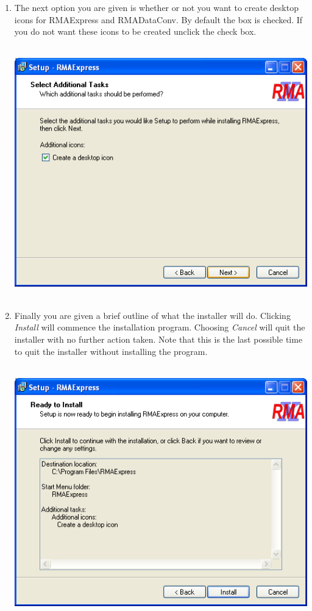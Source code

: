 \documentclass[11pt]{report}
\begin{document}
\begin{enumerate}
\item The next option you are given is whether or not you want to create desktop icons for RMAExpress and RMADataConv. By default the box is checked. If you do not want these icons to be created unclick the check box. \\ \\
\begin{center}
\includegraphics[scale=0.5]{Setup4}\
\end{center}
\item  Finally you are given a brief outline of what the installer will do. Clicking {\it Install} will commence the installation program. Choosing {\it Cancel} will quit the installer with no further action taken.  Note that this is the last possible time to quit the installer without installing the program.
\\ \\ 
\begin{center}
\includegraphics[scale=0.5]{Setup5}
\end{center}


\end{enumerate}
\end{document}
